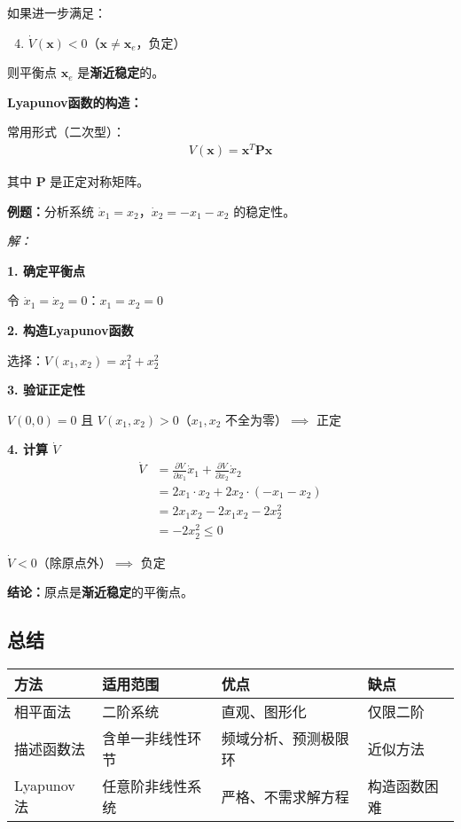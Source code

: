 如果进一步满足：
\begin{enumerate}
    \setcounter{enumi}{3}
    \item $\dot{V}(\mathbf{x}) < 0$（$\mathbf{x} \neq \mathbf{x}_e$，负定）
\end{enumerate}

则平衡点 $\mathbf{x}_e$ 是\textbf{渐近稳定}的。

\vspace{0.3cm}
\textbf{Lyapunov函数的构造：}

常用形式（二次型）：
\begin{align*}
V(\mathbf{x}) = \mathbf{x}^T \mathbf{P} \mathbf{x}
\end{align*}

其中 $\mathbf{P}$ 是正定对称矩阵。

\vspace{0.3cm}
\textbf{例题：}分析系统 $\dot{x}_1 = x_2$，$\dot{x}_2 = -x_1 - x_2$ 的稳定性。

\textit{解：}

\textbf{1. 确定平衡点}

令 $\dot{x}_1 = \dot{x}_2 = 0$：$x_1 = x_2 = 0$

\textbf{2. 构造Lyapunov函数}

选择：$V(x_1, x_2) = x_1^2 + x_2^2$

\textbf{3. 验证正定性}

$V(0, 0) = 0$ 且 $V(x_1, x_2) > 0$（$x_1, x_2$ 不全为零）$\implies$ 正定

\textbf{4. 计算 $\dot{V}$}
\begin{align*}
\dot{V} &= \frac{\partial V}{\partial x_1}\dot{x}_1 + \frac{\partial V}{\partial x_2}\dot{x}_2 \\
&= 2x_1 \cdot x_2 + 2x_2 \cdot (-x_1 - x_2) \\
&= 2x_1 x_2 - 2x_1 x_2 - 2x_2^2 \\
&= -2x_2^2 \leq 0
\end{align*}

$\dot{V} < 0$（除原点外）$\implies$ 负定

\textbf{结论：}原点是\textbf{渐近稳定}的平衡点。

\subsection{总结}

\begin{center}
\begin{tabular}{|l|p{4cm}|p{4cm}|p{3cm}|}
\hline
\textbf{方法} & \textbf{适用范围} & \textbf{优点} & \textbf{缺点} \\
\hline
相平面法 & 二阶系统 & 直观、图形化 & 仅限二阶 \\
\hline
描述函数法 & 含单一非线性环节 & 频域分析、预测极限环 & 近似方法 \\
\hline
Lyapunov法 & 任意阶非线性系统 & 严格、不需求解方程 & 构造函数困难 \\
\hline
\end{tabular}
\end{center}

